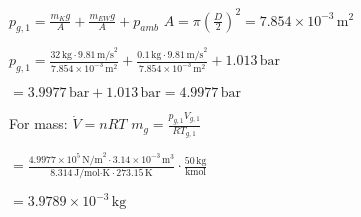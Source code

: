 \( p_{g,1} = \frac{m_{K} g}{A} + \frac{m_{EW} g}{A} + p_{amb} \)  
\( A = \pi \left(\frac{D}{2}\right)^2 = 7.854 \times 10^{-3} \, \text{m}^2 \)  

\( p_{g,1} = \frac{32 \, \text{kg} \cdot 9.81 \, \text{m/s}^2}{7.854 \times 10^{-3} \, \text{m}^2} + \frac{0.1 \, \text{kg} \cdot 9.81 \, \text{m/s}^2}{7.854 \times 10^{-3} \, \text{m}^2} + 1.013 \, \text{bar} \)  

\( = 3.9977 \, \text{bar} + 1.013 \, \text{bar} = 4.9977 \, \text{bar} \)  

For mass:  
\( \dot{V} = nRT \)  
\( m_{g} = \frac{p_{g,1} V_{g,1}}{R T_{g,1}} \)  

\( = \frac{4.9977 \times 10^5 \, \text{N/m}^2 \cdot 3.14 \times 10^{-3} \, \text{m}^3}{8.314 \, \text{J/mol·K} \cdot 273.15 \, \text{K}} \cdot \frac{50 \, \text{kg}}{\text{kmol}} \)  

\( = 3.9789 \times 10^{-3} \, \text{kg} \)